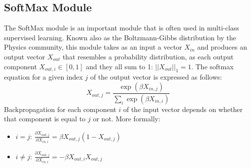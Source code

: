\subsection{SoftMax Module}

The SoftMax module is an important module that is often used in multi-class supervised learning.
Known also as the Boltzmann-Gibbs distribution by the Physics community, this module takes as an input a vector $X_{in}$ and produces an output vector $X_{out}$ that resembles a probability distribution, as each output component $X_{out, i} \in [0, 1]$ and they all sum to 1: $||X_{out}||_1 = 1$.
The softmax equation for a given index $j$ of the output vector is expressed as follows: $$X_{out, j} = \frac{\exp(\beta X_{in, j})}{\sum_i{\exp(\beta X_{in, i})}}$$ Backpropagation for each component $i$ of the input vector depends on whether that component is equal to $j$ or not.
More formally:
\begin{itemize}
    \item $i = j$: $\frac{\partial X_{out, j}}{\partial X_{in, i}} = \beta X_{out, j}(1 - X_{out, j})$
    \item $i \neq j$: $\frac{\partial X_{out, j}}{\partial X_{in, i}} = -\beta X_{out, i}X_{out, j}$
\end{itemize}

